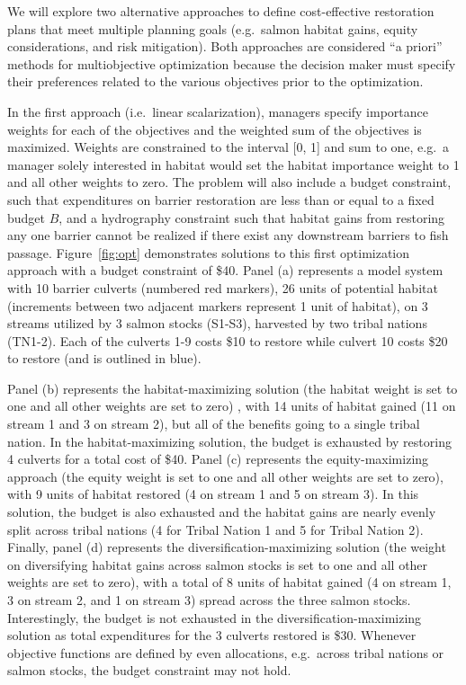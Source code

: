 \documentclass[12pt]{elsarticle}
\begin{document}
We will explore two alternative approaches to define cost-effective restoration plans that meet multiple planning goals (e.g.\ salmon habitat gains, equity considerations, and risk mitigation). Both approaches are considered ``a priori'' methods for multiobjective optimization because the decision maker must specify their preferences related to the various objectives prior to the optimization. 

In the first approach (i.e.\ linear scalarization), managers specify importance weights for each of the objectives and the weighted sum of the objectives is maximized. Weights are constrained to the interval [0, 1] and sum to one, e.g.\ a manager solely interested in habitat would set the habitat importance weight to 1 and all other weights to zero. The problem will also include a budget constraint, such that expenditures on barrier restoration are less than or equal to a fixed budget $B$, and a hydrography constraint such that habitat gains from restoring any one barrier cannot be realized if there exist any downstream barriers to fish passage. Figure~\ref{fig:opt} demonstrates solutions to this first optimization approach with a budget constraint of \$40. Panel (a) represents a model system with 10 barrier culverts (numbered red markers), 26 units of potential habitat (increments between two adjacent markers represent 1 unit of habitat), on 3 streams utilized by 3 salmon stocks (S1-S3), harvested by two tribal nations (TN1-2). Each of the culverts 1-9 costs \$10 to restore while culvert 10 costs \$20 to restore (and is outlined in blue).

Panel (b) represents the habitat-maximizing solution (the habitat weight is set to one and all other weights are set to zero) , with 14 units of habitat gained (11 on stream 1 and 3 on stream 2), but all of the benefits going to a single tribal nation. In the habitat-maximizing solution, the budget is exhausted by restoring 4 culverts for a total cost of \$40. Panel (c) represents the equity-maximizing approach (the equity weight is set to one and all other weights are set to zero), with 9 units of habitat restored (4 on stream 1 and 5 on stream 3). In this solution, the budget is also exhausted and the habitat gains are nearly evenly split across tribal nations (4 for Tribal Nation 1 and 5 for Tribal Nation 2). Finally, panel (d) represents the diversification-maximizing solution (the weight on diversifying habitat gains across salmon stocks is set to one and all other weights are set to zero), with a total of 8 units of habitat gained (4 on stream 1, 3 on stream 2, and 1 on stream 3) spread across the three salmon stocks. Interestingly, the budget is not exhausted in the diversification-maximizing solution as total expenditures for the 3 culverts restored is \$30. Whenever objective functions are defined by even allocations, e.g.\ across tribal nations or salmon stocks, the budget constraint may not hold.
\end{document}
